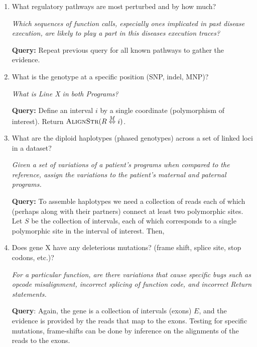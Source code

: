 \documentclass[10pt,fullpage]{article}
\def\ensuretext{\textrm}
\newcommand{\Reads}{\ensuretext{{\sc Reads}}}
\newcommand{\AlignStr}{\ensuretext{{\sc AlignStr}}}
\newcommand{\Intervals}{\ensuretext{{\sc Intervals}}}
\newcommand{\Partner}{\ensuretext{{\sc Partner}}}
\newcommand{\MapRel}{\ensuremath{\stackrel{M}{\Leftrightarrow}}}
\newenvironment{packed_enum}{
\begin{enumerate}
  \setlength{\itemsep}{1pt}
  \setlength{\parskip}{0pt}
  \setlength{\parsep}{0pt}
}{\end{enumerate}}
\begin{document}
\begin{enumerate}
\item What regulatory pathways are most perturbed and by how much? 

{\em Which sequences of function calls, especially ones implicated in past
disease execution, are likely to play a part in this diseases 
execution traces?}

{\bf Query:} Repeat previous query for all known pathways to gather the evidence.

\item What is the genotype at a specific position (SNP, indel, MNP)? 

{\em What is Line X in both Programs?} 

{\bf Query: } Define an interval $i$ by a single coordinate
(polymorphism of interest). Return $\AlignStr(R\MapRel i)$.


\item What are the diploid haplotypes (phased genotypes) across a set of linked 
loci in a dataset? 

{\em Given a set of variations of a patient's programs when compared to the 
reference, assign the variations to the patient's 
maternal and paternal programs.}

{\bf Query:} To assemble haplotypes we need a collection of reads each
of which (perhaps along with their partners) connect at least two
polymorphic sites. Let $S$ be the collection of intervals, each of
which corresponds to a single polymorphic site in the interval of
interest. Then,



\item Does gene X have any deleterious mutations? (frame shift, splice site, 
stop codons, etc.)? 

{\em For a particular function, are there variations that cause
  specific bugs such as opcode misalignment, incorrect splicing of
  function code, and incorrect Return statements.}

{\bf Query}: Again, the gene is a collection of intervals (exons) $E$,
and the evidence is provided by the reads that map to the
exons. Testing for specific mutations, frame-shifts can be done by
inference on the alignments of the reads to the exons. 


\end{enumerate}
\end{document}
